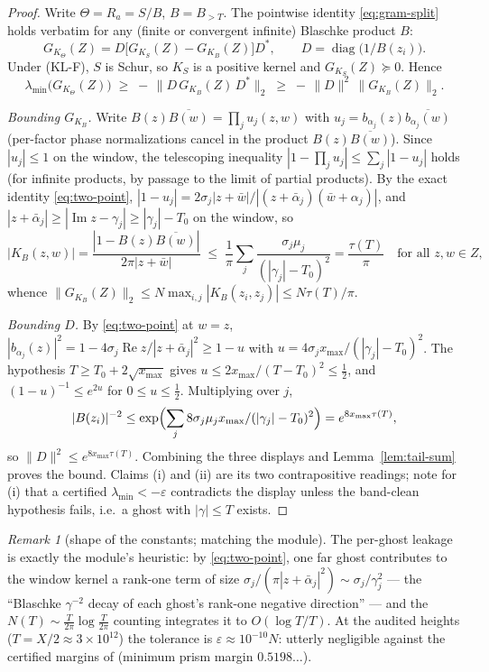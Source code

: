 \documentclass[11pt]{article}
\theoremstyle{definition}
\theoremstyle{remark}
\newtheorem{remark}[theorem]{Remark}
\newcommand{\re}{\operatorname{Re}}
\newcommand{\im}{\operatorname{Im}}
\begin{document}
\begin{proof}
Write $\Theta=R_a=S/B$, $B=B_{>T}$. The pointwise identity
\eqref{eq:gram-split} holds verbatim for any (finite or convergent infinite)
Blaschke product $B$:
\[
G_{K_\Theta}(Z)=D\bigl[G_{K_S}(Z)-G_{K_B}(Z)\bigr]D^{*},
\qquad D=\operatorname{diag}\bigl(1/B(z_i)\bigr).
\]
Under (KL-F), $S$ is Schur, so $K_S$ is a positive kernel and
$G_{K_S}(Z)\succeq0$. Hence
\[
\lambda_{\min}\bigl(G_{K_\Theta}(Z)\bigr)\;\ge\;-\,\bigl\|D\,G_{K_B}(Z)\,D^{*}\bigr\|_2
\;\ge\;-\,\|D\|^2\,\bigl\|G_{K_B}(Z)\bigr\|_2 .
\]

\emph{Bounding $G_{K_B}$.} Write $B(z)\overline{B(w)}=\prod_j u_j(z,w)$ with
$u_j=b_{\alpha_j}(z)\overline{b_{\alpha_j}(w)}$ (per-factor phase
normalizations cancel in the product $B(z)\overline{B(w)}$). Since
$|u_j|\le1$ on the window, the telescoping inequality
$|1-\prod_j u_j|\le\sum_j|1-u_j|$ holds (for infinite products, by passage to
the limit of partial products). By the exact identity \eqref{eq:two-point},
$|1-u_j|=2\sigma_j|z+\bar w|/|(z+\bar\alpha_j)(\bar w+\alpha_j)|$, and
$|z+\bar\alpha_j|\ge|\im z-\gamma_j|\ge|\gamma_j|-T_0$ on the window, so
\[
\bigl|K_B(z,w)\bigr|
=\frac{|1-B(z)\overline{B(w)}|}{2\pi|z+\bar w|}
\;\le\;\frac{1}{\pi}\sum_j\frac{\sigma_j\mu_j}{(|\gamma_j|-T_0)^{2}}
=\frac{\tau(T)}{\pi}
\quad\text{for all }z,w\in Z,
\]
whence $\|G_{K_B}(Z)\|_2\le N\max_{i,j}|K_B(z_i,z_j)|\le N\tau(T)/\pi$.

\emph{Bounding $D$.} By \eqref{eq:two-point} at $w=z$,
$|b_{\alpha_j}(z)|^2=1-4\sigma_j\re z/|z+\bar\alpha_j|^2
\ge1-u$ with $u=4\sigma_j x_{\max}/(|\gamma_j|-T_0)^{2}$. The hypothesis
$T\ge T_0+2\sqrt{x_{\max}}$ gives $u\le 2x_{\max}/(T-T_0)^2\le\tfrac12$, and
$(1-u)^{-1}\le e^{2u}$ for $0\le u\le\tfrac12$. Multiplying over $j$,
\[
|B(z_i)|^{-2}\le\exp\Bigl(\sum_j 8\sigma_j\mu_j x_{\max}/(|\gamma_j|-T_0)^2\Bigr)
=e^{8x_{\max}\tau(T)},
\]
so $\|D\|^2\le e^{8x_{\max}\tau(T)}$. Combining the three displays and
Lemma~\ref{lem:tail-sum} proves the bound. Claims (i) and (ii) are its two
contrapositive readings; note for (i) that a certified
$\lambda_{\min}<-\varepsilon$ contradicts the display unless the band-clean
hypothesis fails, i.e.\ a ghost with $|\gamma|\le T$ exists.
\end{proof}

\begin{remark}[shape of the constants; matching the module]\label{rem:l1-shape}
The per-ghost leakage is exactly the module's heuristic: by
\eqref{eq:two-point}, one far ghost contributes to the window kernel a
rank-one term of size $\sigma_j/(\pi|z+\bar\alpha_j|^2)\sim\sigma_j/\gamma_j^2$
--- the ``Blaschke $\gamma^{-2}$ decay of each ghost's rank-one negative
direction'' --- and the $N(T)\sim\frac{T}{2\pi}\log\frac{T}{2\pi}$ counting
integrates it to $O(\log T/T)$. At the audited heights
($T=X/2\approx3\times10^{12}$) the tolerance is
$\varepsilon\approx 10^{-10}N$: utterly negligible against the certified
margins of \cite{BarrierCert} (minimum prism margin $0.5198\dots$).
\end{remark}
\end{document}
